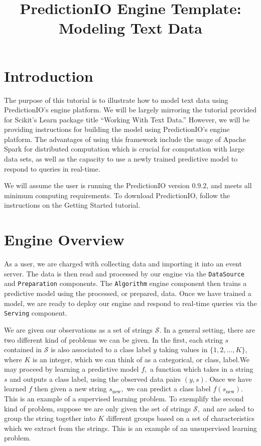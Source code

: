 \documentclass[a4paper,12pt]{article}
\renewcommand{\bf}[1]{\textbf{#1}}
\renewcommand{\tt}[1]{\texttt{#1}}
\newcommand{\3}{\left}
\newcommand{\4}{\right}
\renewcommand{\-}[1]{{}^{-#1}}
\begin{document}
\title{\vspace{-1.5 cm}\bf{ \Large PredictionIO Engine Template: Modeling Text Data}}
\author{\vspace{-1.5cm}}
\date{}
\maketitle

\section*{\normalsize Introduction}

The purpose of this tutorial is to illustrate how to model text data using PredictionIO's engine platform. We will be largely mirroring the tutorial provided for Scikit's Learn package title \enquote{Working With Text Data.} However, we will be providing instructions for building the model using PredictionIO's engine platform. The advantages of using this framework include the usage of Apache Spark for distributed computation which is crucial for computation with large data sets, as well as the capacity to use a newly trained predictive model to respond to queries in real-time. 

We will assume the user is running the PredictionIO version 0.9.2, and meets all minimum computing requirements. To download PredictionIO, follow the instructions on the Getting Started tutorial.

\section*{\normalsize Engine Overview}




As a user, we are charged with collecting data and importing it into an event server. The data is then read and processed by our engine via the \tt{DataSource} and \tt{Preparation} components. The \tt{Algorithm} engine component then trains a predictive model using the processed, or prepared, data. Once we have trained a model, we are ready to deploy our engine and respond to real-time queries via the \tt{Serving} component. 

We are given our observations as a set of strings $\mathcal{S}.$ In a general setting, there are two different kind of problems we can be given. In the first, each string $s$ contained in $\mathcal{S}$ is also associated to a class label $y$ taking values in $\{1, 2, ..., K\},$ where $K$ is an integer, which we can think of as a categorical, or class, label.We may proceed by learning a predictive model $f,$ a function which takes in a string $s$ and outputs a class label, using the observed data pairs $(y, s).$ Once we have learned $f$ then given a new string $s_\text{new},$ we can predict a class label $f(s_\text{new}).$ This is an example of a supervised learning problem. To exemplify the second kind of problem, suppose we are only given the set of strings $\mathcal {S},$ and are asked to group the string together into $K$ different groups based on a set of characteristics which we extract from the strings. This is an example of an unsupervised learning problem. 
\end{document}
